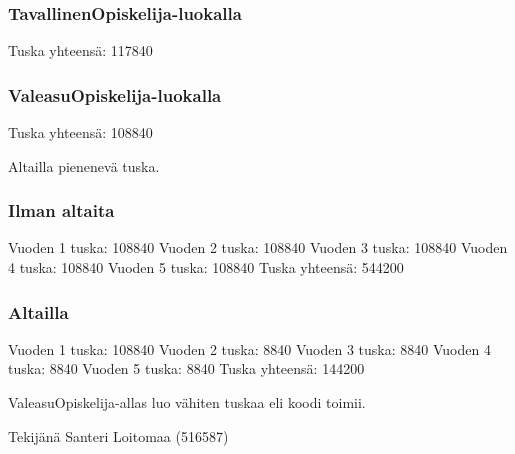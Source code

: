 \subsubsection{TavallinenOpiskelija-luokalla}
\label{TavallinenOpiskelija-luokalla}
\begin{javacode}
Tuska yhteensä: 117840
\end{javacode}

\subsubsection{ValeasuOpiskelija-luokalla}
\label{ValeasuOpiskelija-luokalla}
\begin{javacode}
Tuska yhteensä: 108840
\end{javacode}

Altailla pienenevä tuska.

\subsubsection{Ilman altaita}
\label{Ilman altaita}
\begin{javacode}
Vuoden 1 tuska: 108840
Vuoden 2 tuska: 108840
Vuoden 3 tuska: 108840
Vuoden 4 tuska: 108840
Vuoden 5 tuska: 108840
Tuska yhteensä: 544200
\end{javacode}

\subsubsection{Altailla}
\label{Altailla}
\begin{javacode}
Vuoden 1 tuska: 108840
Vuoden 2 tuska: 8840
Vuoden 3 tuska: 8840
Vuoden 4 tuska: 8840
Vuoden 5 tuska: 8840
Tuska yhteensä: 144200
\end{javacode}

ValeasuOpiskelija-allas luo vähiten tuskaa eli koodi toimii.

Tekijänä Santeri Loitomaa (516587)

\label{endofpages}
